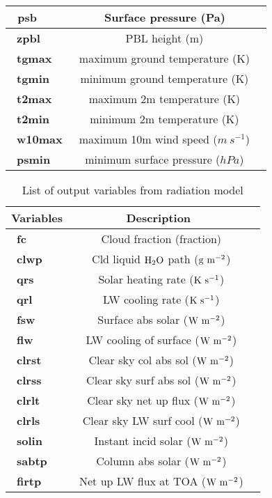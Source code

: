 \begin{table}[!]
\begin{center}
\begin{tabular}{|l|c|l|}
{\ {\bf psb}}    & {\ {Surface pressure (Pa)} }     \\ \hline
{\ {\bf zpbl}}    & {\ {PBL height (m)}}       \\ \hline
{\ {\bf tgmax}}    & {\ {maximum ground temperature (K)}}       \\ \hline
{\ {\bf tgmin}}    & {\ {minimum ground temperature (K)}}      \\ \hline
{\ {\bf t2max}}    & {\ {maximum 2m temperature (K)}}     \\ \hline
{\ {\bf t2min}}    & {\ {minimum 2m temperature (K)}}       \\ \hline
{\ {\bf w10max}}    & {\ {maximum 10m wind speed ($ m~s^{-1}$)}}     \\ \hline
{\ {\bf psmin}}    & {\ {minimum surface pressure ($hPa$)}}       \\ \hline

\end{tabular}
\end{center}
\end{table}

\begin{table}[!]
\begin{center}
\caption{List of output variables from radiation model}  \label{rad_var}
\vspace{0.25cm}
\begin{tabular}{|l|c|l|} \hline \hline
{\small {\bf Variables}} & {\small {\bf Description}} \\ \hline \hline
{\ {\bf fc}}    & {\ {Cloud fraction (fraction)} }      \\ \hline
{\ {\bf clwp}}    & {\ {Cld liquid ${\rm H_2O}$ path (${\rm g~m^{-2}}$)} }    \\ \hline
{\ {\bf qrs}}    & {\ {Solar heating rate (${\rm K~s^{-1}}$)}}       \\ \hline
{\ {\bf qrl}}    & {\ {LW cooling rate (${\rm K~s^{-1}}$)} }      \\ \hline
{\ {\bf fsw}}    & {\ {Surface abs solar (${\rm W~m^{-2}}$)} }     \\ \hline
{\ {\bf flw}}    & {\ {LW cooling of surface (${\rm W~m^{-2}}$)}}       \\ \hline
{\ {\bf clrst}}    & {\ {Clear sky col abs sol (${\rm W~m^{-2}}$)} }      \\ \hline
{\ {\bf clrss}}    & {\ {Clear sky surf abs sol (${\rm W~m^{-2}}$)} }     \\ \hline
{\ {\bf clrlt}}    & {\ {Clear sky net up flux (${\rm W~m^{-2}}$)}}       \\ \hline
{\ {\bf clrls}}    & {\ {Clear sky LW surf cool (${\rm W~m^{-2}}$)} }      \\ \hline
{\ {\bf solin}}    & {\ {Instant incid solar (${\rm W~m^{-2}}$)} }     \\ \hline
{\ {\bf sabtp}}    & {\ {Column abs solar (${\rm W~m^{-2}}$) }}       \\ \hline
{\ {\bf firtp}}    & {\ {Net up LW flux at TOA (${\rm W~m^{-2}}$)}}       \\ \hline
\end{tabular}
\end{center}
\end{table}


